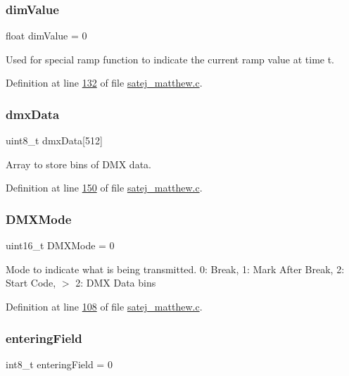 \subsubsection{\texorpdfstring{dimValue}{dimValue}}
{\footnotesize\ttfamily float dim\+Value = 0}

Used for special ramp function to indicate the current ramp value at time t. 

Definition at line \mbox{\hyperlink{satej__matthew_8c_source_l00132}{132}} of file \mbox{\hyperlink{satej__matthew_8c_source}{satej\+\_\+matthew.\+c}}.

\mbox{\label{satej__matthew_8c_a94df0a1f870976c09bb86a0885b47388}} 
\subsubsection{\texorpdfstring{dmxData}{dmxData}}
{\footnotesize\ttfamily uint8\+\_\+t dmx\+Data\mbox{[}512\mbox{]}}

Array to store bins of D\+MX data. 

Definition at line \mbox{\hyperlink{satej__matthew_8c_source_l00150}{150}} of file \mbox{\hyperlink{satej__matthew_8c_source}{satej\+\_\+matthew.\+c}}.

\mbox{\label{satej__matthew_8c_a57f25f3dc6e734d597fcd5abacb04166}} 
\subsubsection{\texorpdfstring{DMXMode}{DMXMode}}
{\footnotesize\ttfamily uint16\+\_\+t D\+M\+X\+Mode = 0}

Mode to indicate what is being transmitted. 0\+: Break, 1\+: Mark After Break, 2\+: Start Code, $>$ 2\+: D\+MX Data bins 

Definition at line \mbox{\hyperlink{satej__matthew_8c_source_l00108}{108}} of file \mbox{\hyperlink{satej__matthew_8c_source}{satej\+\_\+matthew.\+c}}.

\mbox{\label{satej__matthew_8c_a946da241f5739dded95e618792fa754a}} 
\subsubsection{\texorpdfstring{enteringField}{enteringField}}
{\footnotesize\ttfamily int8\+\_\+t entering\+Field = 0}


